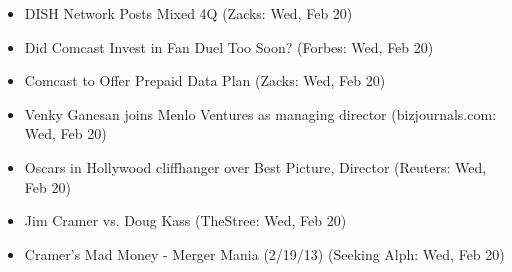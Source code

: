 \documentclass[11pt,asymmetric]{article}
\begin{document}
\begin{itemize}
\item DISH Network Posts Mixed 4Q (Zacks: Wed, Feb 20)
\item Did Comcast Invest in Fan Duel Too Soon? (Forbes: Wed, Feb 20)
\item Comcast to Offer Prepaid Data Plan (Zacks: Wed, Feb 20)
\item Venky Ganesan joins Menlo Ventures as managing director (bizjournals.com: Wed, Feb 20)
\item Oscars in Hollywood cliffhanger over Best Picture, Director (Reuters: Wed, Feb 20)
\item Jim Cramer vs. Doug Kass (TheStree: Wed, Feb 20)
\item Cramer's Mad Money - Merger Mania (2/19/13) (Seeking Alph: Wed, Feb 20)
\end{itemize}
\end{document}
